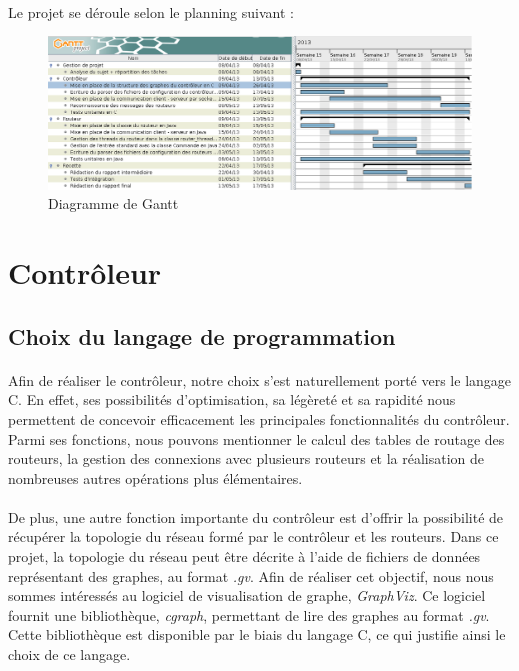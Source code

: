 \paragraph{}Le projet se déroule selon le planning suivant :
\vspace{1em}
    \begin{figure}[!h]
	\begin{center}
	    \includegraphics[scale=0.45]{gantt.png}
	\end{center}
	\caption{Diagramme de Gantt}
    \end{figure}
\newpage

\newpage
\section{Contrôleur}

\subsection{Choix du langage de programmation}
\paragraph{}Afin de réaliser le contrôleur, notre choix s'est naturellement porté
vers le langage C. En effet, ses possibilités d'optimisation, sa légèreté et sa rapidité nous permettent de concevoir efficacement les principales fonctionnalités du contrôleur. Parmi ses fonctions, nous pouvons mentionner le calcul des tables de routage des routeurs, la gestion des connexions avec plusieurs routeurs et la réalisation de nombreuses autres opérations plus élémentaires.
\paragraph{}De plus, une autre fonction importante du contrôleur est d'offrir la possibilité de récupérer la topologie du réseau formé par le contrôleur et les routeurs. Dans ce projet, la topologie du réseau peut être décrite à l'aide de fichiers de données représentant des graphes, au format \textit{.gv}. Afin de réaliser cet objectif, nous nous sommes intéressés au logiciel de visualisation de graphe, \textit{GraphViz}. Ce logiciel fournit une bibliothèque, \textit{cgraph}, permettant de lire des graphes au format \textit{.gv}. Cette bibliothèque est disponible par le biais du langage C, ce qui justifie ainsi le choix de ce langage.

